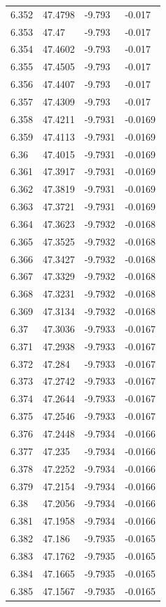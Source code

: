\begin{tabular}{llll}
6.352 & 47.4798 & -9.793 & -0.017 \\
6.353 & 47.47 & -9.793 & -0.017 \\
6.354 & 47.4602 & -9.793 & -0.017 \\
6.355 & 47.4505 & -9.793 & -0.017 \\
6.356 & 47.4407 & -9.793 & -0.017 \\
6.357 & 47.4309 & -9.793 & -0.017 \\
6.358 & 47.4211 & -9.7931 & -0.0169 \\
6.359 & 47.4113 & -9.7931 & -0.0169 \\
6.36 & 47.4015 & -9.7931 & -0.0169 \\
6.361 & 47.3917 & -9.7931 & -0.0169 \\
6.362 & 47.3819 & -9.7931 & -0.0169 \\
6.363 & 47.3721 & -9.7931 & -0.0169 \\
6.364 & 47.3623 & -9.7932 & -0.0168 \\
6.365 & 47.3525 & -9.7932 & -0.0168 \\
6.366 & 47.3427 & -9.7932 & -0.0168 \\
6.367 & 47.3329 & -9.7932 & -0.0168 \\
6.368 & 47.3231 & -9.7932 & -0.0168 \\
6.369 & 47.3134 & -9.7932 & -0.0168 \\
6.37 & 47.3036 & -9.7933 & -0.0167 \\
6.371 & 47.2938 & -9.7933 & -0.0167 \\
6.372 & 47.284 & -9.7933 & -0.0167 \\
6.373 & 47.2742 & -9.7933 & -0.0167 \\
6.374 & 47.2644 & -9.7933 & -0.0167 \\
6.375 & 47.2546 & -9.7933 & -0.0167 \\
6.376 & 47.2448 & -9.7934 & -0.0166 \\
6.377 & 47.235 & -9.7934 & -0.0166 \\
6.378 & 47.2252 & -9.7934 & -0.0166 \\
6.379 & 47.2154 & -9.7934 & -0.0166 \\
6.38 & 47.2056 & -9.7934 & -0.0166 \\
6.381 & 47.1958 & -9.7934 & -0.0166 \\
6.382 & 47.186 & -9.7935 & -0.0165 \\
6.383 & 47.1762 & -9.7935 & -0.0165 \\
6.384 & 47.1665 & -9.7935 & -0.0165 \\
6.385 & 47.1567 & -9.7935 & -0.0165 \\

\end{tabular}
